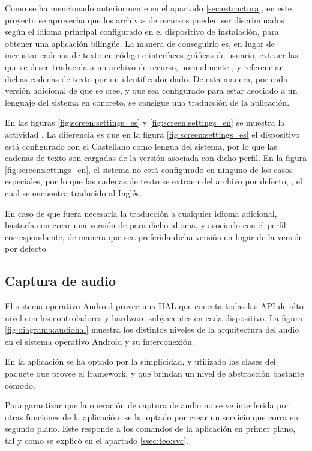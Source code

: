    Como se ha mencionado anteriormente en el apartado \ref{sec:estructura}, en este proyecto se aprovecha que los archivos de recursos pueden ser discriminados según el idioma principal configurado en el dispositivo de instalación, para obtener una aplicación bilingüe. La manera de conseguirlo es, en lugar de incrustar cadenas de texto en código e interfaces gráficas de usuario, extraer las que se desee traducida a un archivo de recurso, normalmente , y referenciar dichas cadenas de texto por un identificador dado. De esta manera, por cada versión adicional de  que se cree, y que sea configurado para estar asociado a un lenguaje del sistema en concreto, se consigue una traducción de la aplicación.
    
    En las figuras \ref{fig:screen:settings_es} y \ref{fig:screen:settings_en} se muestra la actividad . La diferencia es que en la figura \ref{fig:screen:settings_es} el dispositivo está configurado con el Castellano como lengua del sistema, por lo que las cadenas de texto son cargadas de la versión  asociada con dicho perfil. En la figura \ref{fig:screen:settings_en}, el sistema no está configurado en ninguno de los casos especiales, por lo que las cadenas de texto se extraen del archivo por defecto, , el cual se encuentra traducido al Inglés.
    
    En caso de que fuera necesaria la traducción a cualquier idioma adicional, bastaría con crear una versión de  para dicho idioma, y asociarlo con el perfil correspondiente, de manera que sea preferida dicha versión en lugar de la versión por defecto.
    
\subsection{Captura de audio}

    El sistema operativo Android provee una \ac{HAL} que conecta todas las \ac{API} de alto nivel con los controladores y hardware subyacentes en cada dispositivo. La figura \ref{fig:diagrama:audiohal} muestra los distintos niveles de la arquitectura del audio en el sistema operativo Android y su interconexión.

En la aplicación se ha optado por la simplicidad, y utilizado las clases del paquete  que provee el framework, y que brindan un nivel de abstracción bastante cómodo.

    Para garantizar que la operación de captura de audio no se ve interferida por otras funciones de la aplicación, se ha optado por crear un servicio que corra en segundo plano. Este responde a los comandos de la aplicación en primer plano, tal y como se explicó en el apartado \ref{ssec:teo:svc}.

